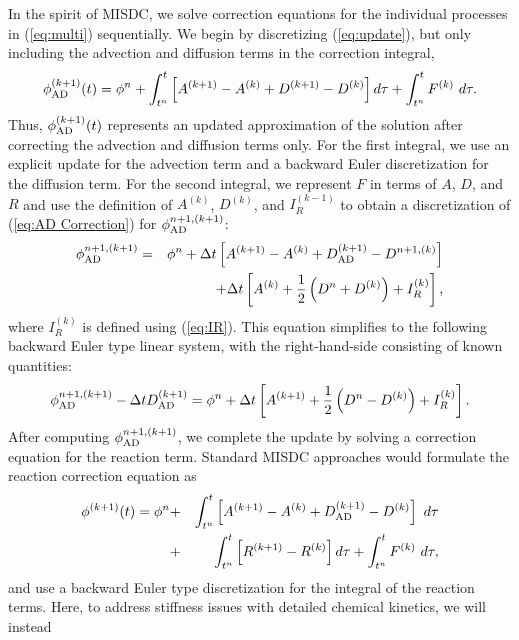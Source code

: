 In the spirit of MISDC, we solve correction equations for the individual processes in 
(\ref{eq:multi}) sequentially.  We begin by discretizing (\ref{eq:update}), but only
including the advection and diffusion terms in the correction integral,
\begin{equation}
\phi_{\rm AD}^{(k+1)}(t) = \phi^n + \int_{t^n}^t \left[A^{(k+1)} - A^{(k)} + D^{(k+1)} - D^{(k)}\right]d\tau + \int_{t^n}^t F^{(k)}~d\tau.\label{eq:AD Correction}
\end{equation}
Thus, $\phi_{\rm AD}^{(k+1)}(t)$ represents an updated approximation of the solution after correcting the
advection and diffusion terms only.  For the first integral, we use an explicit update for the advection term and a 
backward Euler discretization for the diffusion term.
For the second integral, we represent $F$ in terms of $A$, $D$, and $R$ and
use the definition
of $A^{(k)}$, $D^{(k)}$, and $I_R^{(k-1)}$ to obtain
a discretization of (\ref{eq:AD Correction}) for 
$\phi_{\rm AD}^{n+1,(k+1)}$:
\begin{eqnarray}
\phi_{\rm AD}^{n+1,(k+1)} &=& \phi^n + \Delta t  \left[A^{(k+1)} - A^{(k)} + D_{\rm AD}^{(k+1)} - D^{n+1,(k)}\right] \nonumber \\
&&\hspace{0.5cm}+ \Delta t\left[A^{(k)} + \frac{1}{2}\left(D^n + D^{(k)}\right) + I_R^{(k)}\right],
\end{eqnarray}
where $I_R^{(k)}$ is defined using (\ref{eq:IR}).
This equation simplifies to the following backward Euler type linear system, with the
right-hand-side consisting of known quantities:
\begin{equation}
\phi_{\rm AD}^{n+1,(k+1)} - \Delta t D_{\rm AD}^{(k+1)} = \phi^n + \Delta t \left[A^{(k+1)} + \frac{1}{2}\left(D^n - D^{(k)}\right) + I_R^{(k)}\right].
\label{eq:AD}
\end{equation}
After computing $\phi_{\rm AD}^{n+1,(k+1)}$, we complete the update by solving a correction equation for
the reaction term.  Standard MISDC approaches would formulate the reaction correction equation as
\begin{eqnarray}
{\phi}^{(k+1)}(t) = \phi^n &+& \int_{t^n}^t \left[ A^{(k+1)} - A^{(k)} + D_{\rm AD}^{(k+1)} - D^{(k)} \right]~d\tau \nonumber \\
&+& \int_{t^n}^t \left[R^{(k+1)} - R^{(k)}\right]d\tau + \int_{t^n}^t F^{(k)}~d\tau, \label{eq:stdreact}
\end{eqnarray}
and use a backward Euler type discretization for the integral of the reaction terms.
Here, to address stiffness issues with detailed chemical kinetics, we will instead
